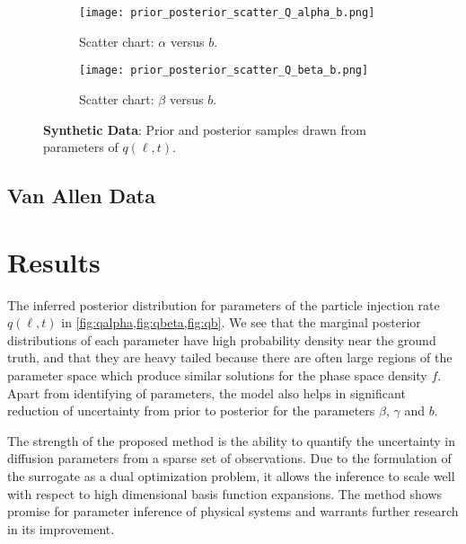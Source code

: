 \begin{figure*}[!htb]
  \centering
  \begin{subfigure}[b]{0.75\textwidth}
    \centering
    \texttt{[image: prior\_posterior\_scatter\_Q\_alpha\_b.png]}
    \caption{ 
      Scatter chart: $\alpha$ versus $b$.  
    }
    \label{fig:alphavsb}
  \end{subfigure}
  \hfill
  \begin{subfigure}[b]{0.75\textwidth}
    \centering
    \texttt{[image: prior\_posterior\_scatter\_Q\_beta\_b.png]}
    \caption{
      Scatter chart: $\beta$ versus $b$.  
    }
    \label{fig:betavsb}
  \end{subfigure}
  \caption{
    \textbf{Synthetic Data}: Prior and posterior samples drawn from parameters of $q(\ell, t)$.
  }
\end{figure*}

\subsection{Van Allen Data}




\section{Results}

The inferred posterior distribution for parameters of the particle injection rate $q(\ell, t)$ in 
\cref{fig:qalpha,fig:qbeta,fig:qb}. We see that the marginal posterior distributions of each 
parameter have high probability density near the ground truth, and that they are heavy tailed 
because there are often large regions of the parameter space which produce similar solutions for 
the phase space density $f$. Apart from identifying of parameters, the model also helps in 
significant reduction of uncertainty from prior to posterior for the parameters $\beta$, 
$\gamma$ and $b$.

The strength of the proposed method is the ability to quantify the uncertainty in diffusion 
parameters from a sparse set of observations. Due to the formulation of the surrogate as a dual 
optimization problem, it allows the inference to scale well with respect to high dimensional basis 
function expansions. The method shows promise for parameter inference of physical systems and 
warrants further research in its improvement.

